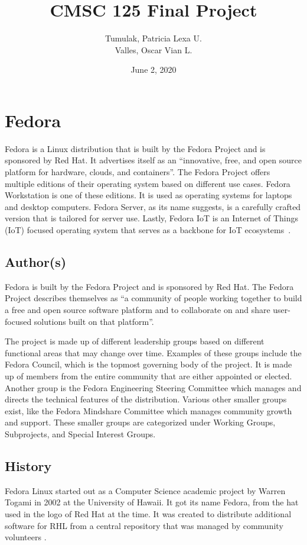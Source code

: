 \documentclass{article}
\title{CMSC 125 Final Project}
\date{June 2, 2020}
\author{Tumulak, Patricia Lexa U.\\Valles, Oscar Vian L.}
\begin{document}
\maketitle
\newpage
\tableofcontents
\newpage
{}

\section{Fedora}
Fedora is a Linux distribution that is built by the Fedora Project and is
sponsored by Red Hat. It advertises itself as an “innovative, free, and open
source platform for hardware, clouds, and containers”. The Fedora Project offers
multiple editions of their operating system based on different use cases. Fedora
Workstation is one of these editions. It is used as operating systems for laptops
and desktop computers. Fedora Server, as its name suggests, is a carefully
crafted version that is tailored for server use. Lastly, Fedora IoT is an
Internet of Things (IoT) focused operating system that serves as a backbone for
IoT ecosystems~\parencite{fedora}.

\subsection{Author(s)}
Fedora is built by the Fedora Project and is sponsored by Red Hat. The Fedora
Project describes themselves as “a community of people working together to build
a free and open source software platform and to collaborate on and share
user-focused solutions built on that platform”.

The project is made up of different leadership groups based on different
functional areas that may change over time. Examples of these groups include the
Fedora Council, which is the topmost governing body of the project. It is made
up of members from the entire community that are either appointed or elected.
Another group is the Fedora Engineering Steering Committee which manages and
directs the technical features of the distribution. Various other smaller groups
exist, like the Fedora Mindshare Committee which manages community growth and
support. These smaller groups are categorized under Working Groups, Subprojects,
and Special Interest Groups. \parencite{fedora_leadership}

\subsection{History}
Fedora Linux started out as a Computer Science academic project by Warren Togami
in 2002 at the University of Hawaii. It got its name Fedora, from the hat used
in the logo of Red Hat at the time. It was created to distribute additional
software for RHL from a central repository that was managed by community
volunteers \parencite{fedora_togami}.
\end{document}
